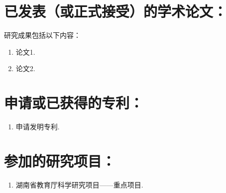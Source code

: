 

\section*{已发表（或正式接受）的学术论文：}

研究成果包括以下内容：

\begin{enumerate}[nosep]
    \item 论文1.
    \item 论文2.
\end{enumerate}

\section*{申请或已获得的专利：}

\begin{enumerate}[nosep]
    \item 申请发明专利.
\end{enumerate}

\section*{参加的研究项目：}

\begin{enumerate}[nosep]
    \item 湖南省教育厅科学研究项目——重点项目.
\end{enumerate}
